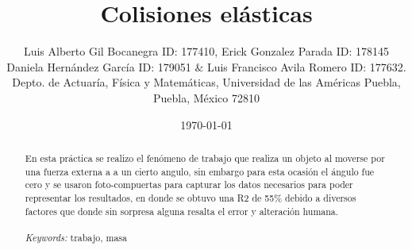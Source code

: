 \documentclass{article}
\begin{document}

\renewcommand{\footrulewidth}{1pt}
\renewcommand{\tablename}{Tabla}
\renewcommand{\figurename}{Figura}


\title{Colisiones elásticas}
\author{\small{Luis Alberto Gil Bocanegra ID: 177410, Erick Gonzalez Parada ID: 178145}\\
 \small{Daniela Hernández García ID: 179051 $\&$ Luis Francisco Avila Romero ID: 177632.}\\		%
	   \small{Depto. de Actuaría, Física y Matemáticas, Universidad de las Américas Puebla, Puebla, M\'exico 72810}}
\date{\small{\today}}

\maketitle


\begin{abstract}
En esta práctica se realizo el fenómeno de trabajo que realiza un objeto al moverse por una fuerza externa a a un cierto angulo, sin embargo para esta ocasión
el ángulo fue cero y se usaron foto-compuertas para capturar los datos necesarios para poder representar los resultados, en donde se obtuvo una R2 de 55$\%$ debido a diversos factores que donde sin sorpresa alguna resalta el error y alteración humana.    
\\
\\
{\it Keywords:}  trabajo, masa  
\\
\\
\end{abstract}
\end{document}
